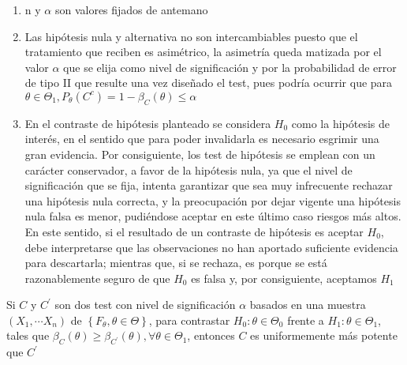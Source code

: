 

\begin{observación}
\vspace{-2.5em}
\begin{enumerate}
\item n y $\alpha$ son valores fijados de antemano
\item Las hipótesis nula y alternativa no son intercambiables puesto que el tratamiento que reciben es asimétrico, la asimetría queda matizada por el valor $\alpha$ que se elija como nivel de significación y por la probabilidad de error de tipo II que resulte una vez diseñado el test, pues podría ocurrir que para $\theta \in \Theta_{1}, P_{\theta}\left(C^{c}\right)=1-\beta_{C}(\theta) \leq \alpha$
\item  En el contraste de hipótesis planteado se considera $H_{0}$ como la hipótesis de interés, en el sentido que para poder invalidarla es necesario esgrimir una gran evidencia. Por consiguiente, los test de hipótesis se emplean con un carácter conservador, a favor de la hipótesis nula, ya que el nivel de significación que se fija, intenta garantizar que sea muy infrecuente rechazar una hipótesis nula correcta, y la preocupación por dejar vigente una hipótesis nula falsa es menor, pudiéndose aceptar en este último caso riesgos más altos. En este sentido, si el resultado de un contraste de hipótesis es aceptar $H_{0}$, debe interpretarse que las observaciones no han aportado suficiente evidencia para descartarla; mientras que, si se rechaza, es porque se está razonablemente seguro de que $H_{0}$ es falsa y, por consiguiente, aceptamos $H_{1}$
\end{enumerate}
\end{observación}

\begin{proposición} 
Si $C$ y $C^{\prime}$ son dos test con nivel de significación $\alpha$ basados en una muestra $\left(X_{1}, \cdots X_{n}\right)$ de $\left\{F_{\theta}, \theta \in \Theta\right\}$, para contrastar $H_{0}: \theta \in \Theta_{0}$ frente a $H_{1}: \theta \in \Theta_{1}$, tales que $\beta_{C}(\theta) \geq \beta_{C^{\prime}}(\theta), \forall \theta \in \Theta_{1}$, entonces $C$ es uniformemente más potente que $C^{\prime}$    
\end{proposición}



